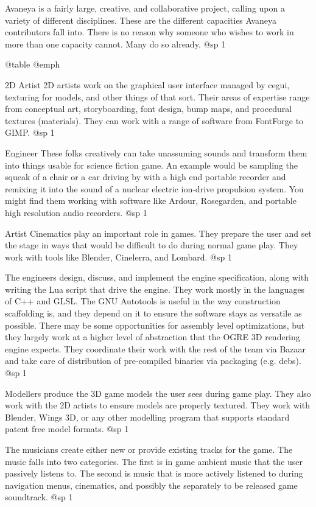 Avaneya is a fairly large, creative, and collaborative project, calling upon a variety of different disciplines. These are the different capacities Avaneya contributors fall into. There is no reason why someone who wishes to work in more than one capacity cannot. Many do so already.
@sp 1

@table @emph
\item2D Artist
2D artists work on the graphical user interface managed by cegui, texturing for models, and other things of that sort. Their areas of expertise range from conceptual art, storyboarding, font design, bump maps, and procedural textures (materials). They can work with a range of software from FontForge to GIMP.
@sp 1

\itemAudio Engineer
These folks creatively can take unassuming sounds and transform them into things usable for science fiction game. An example would be sampling the squeak of a chair or a car driving by with a high end portable recorder and remixing it into the sound of a nuclear electric ion-drive propulsion system. You might find them working with software like Ardour, Rosegarden, and portable high resolution audio recorders.
@sp 1

\itemCinematic Artist
Cinematics play an important role in games. They prepare the user and set the stage in ways that would be difficult to do during normal game play. They work with tools like Blender, Cinelerra, and Lombard.
@sp 1

\itemEngineer
The engineers design, discuss, and implement the engine specification, along with writing the Lua script that drive the engine. They work mostly in the languages of C++ and GLSL. The GNU Autotools is useful in the way construction scaffolding is, and they depend on it to ensure the software stays as versatile as possible. There may be some opportunities for assembly level optimizations, but they largely work at a higher level of abstraction that the OGRE 3D rendering engine expects. They coordinate their work with the rest of the team via Bazaar and take care of distribution of pre-compiled binaries via packaging (e.g. debs).
@sp 1

\itemModeller
Modellers produce the 3D game models the user sees during game play. They also work with the 2D artists to ensure models are properly textured. They work with Blender, Wings 3D, or any other modelling program that supports standard patent free model formats.
@sp 1

\itemMusician
The musicians create either new or provide existing tracks for the game. The music falls into two categories. The first is in game ambient music that the user passively listens to. The second is music that is more actively listened to during navigation menus, cinematics, and possibly the separately to be released game soundtrack.
@sp 1

